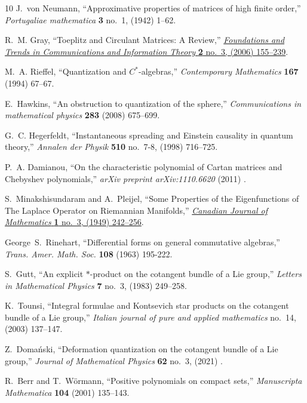 \documentclass[12pt,a4paper]{article}
\numberwithin{equation}{section}
\theoremstyle{theorem}
\theoremstyle{remark}
\begin{document}
\begin{thebibliography}{10}
J.~von Neumann, ``Approximative properties of matrices of high finite order,'' {\em Portugaliae mathematica} {\bfseries 3} no.~1, (1942) 1--62.

R.~M. Gray, ``{Toeplitz and Circulant Matrices: A Review},'' \href{http://dx.doi.org/10.1561/0100000006}{{\em {Foundations and Trends in Communications and Information Theory}} {\bfseries 2} no.~3, (2006) 155--239}.

M.~A. Rieffel, ``{Quantization and $C^*$-algebras},'' {\em Contemporary Mathematics} {\bfseries 167} (1994) 67--67.

E.~Hawkins, ``An obstruction to quantization of the sphere,'' {\em Communications in mathematical physics} {\bfseries 283} (2008) 675--699.

G.~C. Hegerfeldt, ``{Instantaneous spreading and Einstein causality in quantum theory},'' {\em Annalen der Physik} {\bfseries 510} no.~7-8, (1998) 716--725.

P.~A. Damianou, ``{On the characteristic polynomial of Cartan matrices and Chebyshev polynomials},'' {\em arXiv preprint arXiv:1110.6620} (2011) .

S.~Minakshisundaram and A.~Pleijel, ``{Some Properties of the Eigenfunctions of The Laplace Operator on Riemannian Manifolds},'' \href{http://dx.doi.org/10.4153/CJM-1949-021-5}{{\em {Canadian Journal of Mathematics}} {\bfseries 1} no.~3, (1949) 242–256}.


George~S.~Rinehart, ``{Differential forms on general commutative algebras},''
{\em Trans. Amer. Math. Soc.} {\bfseries 108} (1963) 195-222.


S.~Gutt, ``{An explicit $\ast$-product on the cotangent bundle of a Lie group},'' {\em Letters in Mathematical Physics} {\bfseries 7} no.~3, (1983) 249--258.

K.~Tounsi, ``{Integral formulae and Kontsevich star products on the cotangent bundle of a Lie group},'' {\em Italian journal of pure and applied mathematics} no.~14, (2003) 137--147.

Z.~Doma{\'n}ski, ``Deformation quantization on the cotangent bundle of a Lie group,'' {\em Journal of Mathematical Physics} {\bfseries 62} no.~3, (2021) .

R.~Berr and T.~W{\"o}rmann, ``Positive polynomials on compact sets,'' {\em Manuscripta Mathematica} {\bfseries 104} (2001) 135--143.


\end{thebibliography}
\end{document}
